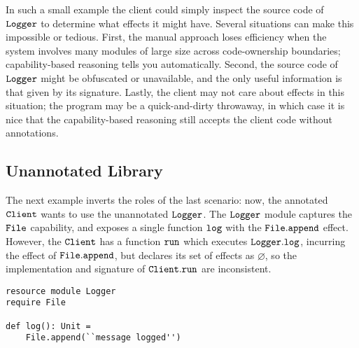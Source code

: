 In such a small example the client could simply inspect the source code of $\mathtt{Logger}$ to determine what effects it might have. Several situations can make this impossible or tedious. First, the manual approach loses efficiency when the system involves many modules of large size across code-ownership boundaries; capability-based reasoning tells you automatically. Second, the source code of $\mathtt{Logger}$ might be obfuscated or unavailable, and the only useful information is that given by its signature. Lastly, the client may not care about effects in this situation; the program may be a quick-and-dirty throwaway, in which case it is nice that the capability-based reasoning still accepts the client code without annotations.











































\subsection{Unannotated Library}

The next example inverts the roles of the last scenario: now, the annotated $\mathtt{Client}$ wants to use the unannotated $\mathtt{Logger}$. The $\mathtt{Logger}$ module captures the $\mathtt{File}$ capability, and exposes a single function $\mathtt{log}$ with the $\mathtt{File.append}$ effect. However, the $\mathtt{Client}$ has a function $\mathtt{run}$ which executes $\mathtt{Logger.log}$, incurring the effect of $\mathtt{File.append}$, but declares its set of effects as $\varnothing$, so the implementation and signature of $\mathtt{Client.run}$ are inconsistent.

\begin{lstlisting}
resource module Logger
require File

def log(): Unit =
    File.append(``message logged'')
\end{lstlisting}

